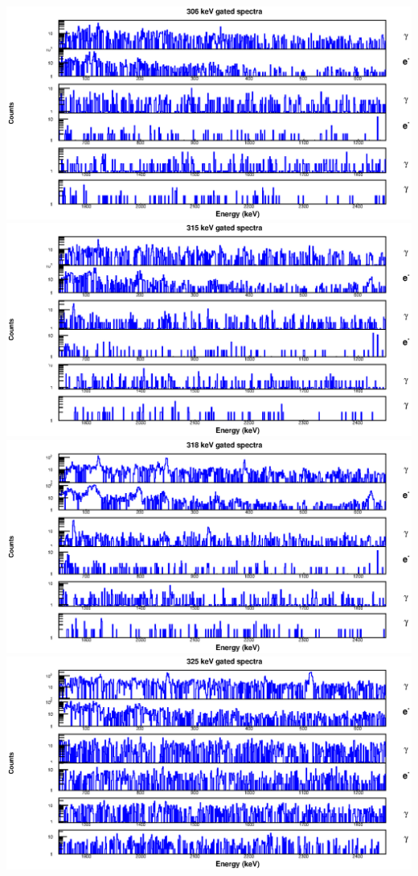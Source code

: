 \begin{landscape}
\includegraphics[scale=1.2]{154Gd_Appendix/306_combined.eps}
\includegraphics[scale=1.2]{154Gd_Appendix/315_combined.eps}
\includegraphics[scale=1.2]{154Gd_Appendix/318_combined.eps}
\includegraphics[scale=1.2]{154Gd_Appendix/325_combined.eps}

\end{landscape}
